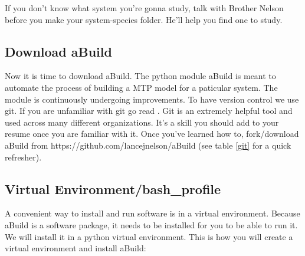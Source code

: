 \documentclass{article}
\begin{document}
If you don't know what system you're gonna study, talk with Brother
Nelson before you make your system-species folder. He'll help you find
one to study. 

\subsection{Download aBuild}
Now it is time to download aBuild. The python module aBuild is meant
to automate the process of building a MTP model for a paticular
system. The module is continuously undergoing improvements. To have
version control we use git. If you are unfamiliar with git go read
. Git is an extremely helpful tool and used across
many different organizations. It's a skill you should add to your
resume once you are familiar with it. Once you've learned how to,
fork/download aBuild from https://github.com/lancejnelson/aBuild (see
table \ref{git} for a quick refresher). 

\subsection{Virtual Environment/bash\_profile}
A convenient way to install and run software is in a virtual
environment. Because aBuild is a software package, it needs to be
installed for you to be able to run it. We will install it in a python
virtual environment. This is how you will create a virtual environment
and install aBuild:
\end{document}

